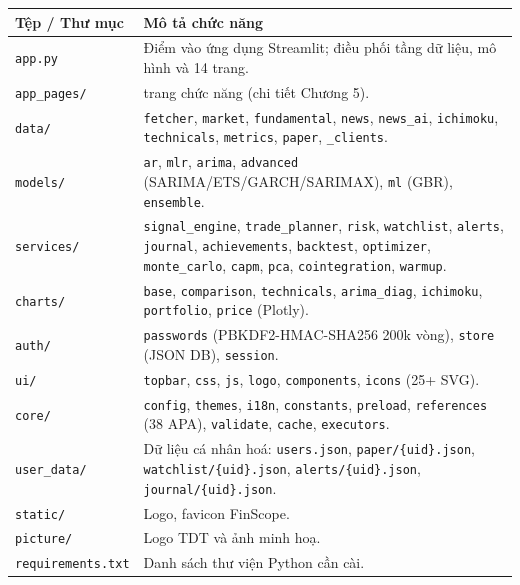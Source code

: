 \documentclass[12pt,a4paper,openany,oneside]{report}
\numberwithin{equation}{chapter}
\begin{document}
\renewcommand{\arraystretch}{1.25}
\setlength{\tabcolsep}{4pt}
{\small
\noindent\begin{tabularx}{\linewidth}{|>{\raggedright\arraybackslash}p{4.5cm}|>{\raggedright\arraybackslash}X|}
\hline
\textbf{Tệp / Thư mục} & \textbf{Mô tả chức năng} \\
\hline
\texttt{app.py} & Điểm vào ứng dụng Streamlit; điều phối tầng dữ liệu, mô hình và 14 trang. \\
\hline
\texttt{app\_pages/} & 14 trang chức năng (chi tiết Chương 5). \\
\hline
\texttt{data/} & \texttt{fetcher}, \texttt{market}, \texttt{fundamental},
   \texttt{news}, \texttt{news\_ai}, \texttt{ichimoku}, \texttt{technicals},
   \texttt{metrics}, \texttt{paper}, \texttt{\_clients}. \\
\hline
\texttt{models/} & \texttt{ar}, \texttt{mlr}, \texttt{arima},
   \texttt{advanced} (SARIMA/ETS/GARCH/SARIMAX), \texttt{ml} (GBR),
   \texttt{ensemble}. \\
\hline
\texttt{services/} & \texttt{signal\_engine}, \texttt{trade\_planner},
   \texttt{risk}, \texttt{watchlist}, \texttt{alerts}, \texttt{journal},
   \texttt{achievements}, \texttt{backtest}, \texttt{optimizer},
   \texttt{monte\_carlo}, \texttt{capm}, \texttt{pca},
   \texttt{cointegration}, \texttt{warmup}. \\
\hline
\texttt{charts/} & \texttt{base}, \texttt{comparison}, \texttt{technicals},
   \texttt{arima\_diag}, \texttt{ichimoku}, \texttt{portfolio},
   \texttt{price} (Plotly). \\
\hline
\texttt{auth/} & \texttt{passwords} (PBKDF2-HMAC-SHA256 200k vòng),
   \texttt{store} (JSON DB), \texttt{session}. \\
\hline
\texttt{ui/} & \texttt{topbar}, \texttt{css}, \texttt{js},
   \texttt{logo}, \texttt{components}, \texttt{icons} (25+ SVG). \\
\hline
\texttt{core/} & \texttt{config}, \texttt{themes}, \texttt{i18n},
   \texttt{constants}, \texttt{preload}, \texttt{references} (38 APA),
   \texttt{validate}, \texttt{cache}, \texttt{executors}. \\
\hline
\texttt{user\_data/} & Dữ liệu cá nhân hoá: \texttt{users.json},
   \texttt{paper/\{uid\}.json}, \texttt{watchlist/\{uid\}.json},
   \texttt{alerts/\{uid\}.json}, \texttt{journal/\{uid\}.json}. \\
\hline
\texttt{static/} & Logo, favicon FinScope. \\
\hline
\texttt{picture/} & Logo TDT và ảnh minh hoạ. \\
\hline
\texttt{requirements.txt} & Danh sách thư viện Python cần cài. \\
\hline
\end{tabularx}}
\end{document}
